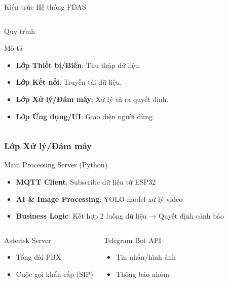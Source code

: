 \begin{frame}[fragile]{Kiến trúc Hệ thống FDAS}
\begin{columns}[t]
\begin{column}{0.5\textwidth}
\begin{block}{Quy trình}
\begin{itemize}
                \end{itemize}
            \end{block}
            \begin{block}{Mô tả}
                \begin{itemize}
                    \item \textbf{Lớp Thiết bị/Biên}: Thu thập dữ liệu.
                    \item \textbf{Lớp Kết nối}: Truyền tải dữ liệu.
                    \item \textbf{Lớp Xử lý/Đám mây}: Xử lý và ra quyết định.
                    \item \textbf{Lớp Ứng dụng/UI}: Giao diện người dùng.
                \end{itemize}
            \end{block}
        \end{column}
    \end{columns}
\end{frame}


\begin{frame}
\frametitle{Lớp Xử lý/Đám mây}

\begin{block}{Main Processing Server (Python)}
\begin{itemize}
\item \textbf{MQTT Client}: Subscribe dữ liệu từ ESP32
\item \textbf{AI \& Image Processing}: YOLO model xử lý video
\item \textbf{Business Logic}: Kết hợp 2 luồng dữ liệu → Quyết định cảnh báo
\end{itemize}
\end{block}

\begin{columns}
\begin{block}{Asterisk Server}
\begin{itemize}
\item Tổng đài PBX
\item Cuộc gọi khẩn cấp (SIP)
\end{itemize}
\end{block}

\begin{block}{Telegram Bot API}
\begin{itemize}
\item Tin nhắn/hình ảnh
\item Thông báo nhóm
\end{itemize}
\end{block}
\end{columns}

\end{frame}

